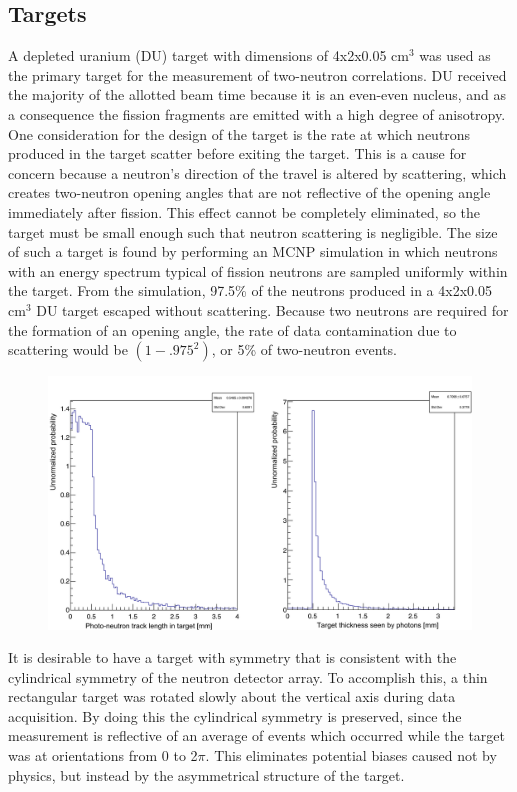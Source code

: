 \subsection{Targets}
A depleted uranium (DU) target with dimensions of 4x2x0.05 $\text{cm}^3$ was used as the primary target for the measurement of two-neutron correlations.
DU received the majority of the allotted beam time because it is an even-even nucleus, and as a consequence the fission fragments are emitted with a high degree of anisotropy.
One consideration for the design of the target is the rate at which neutrons produced in the target scatter before exiting the target.
This is a cause for concern because a neutron's direction of the travel is altered by scattering, which creates two-neutron opening angles that are not reflective of the opening angle immediately after fission.
This effect cannot be completely eliminated, so the target must be small enough such that neutron scattering is negligible.
The size of such a target is found by performing an MCNP simulation in which neutrons with an energy spectrum typical of fission neutrons are sampled uniformly within the target.
From the simulation, 97.5\% of the neutrons produced in a 4x2x0.05 $\text{cm}^3$ DU target escaped without scattering.
Because two neutrons are required for the formation of an opening angle, the rate of data contamination due to scattering would be $(1-.975^2)$, or 5\% of two-neutron events.
\begin{figure}
    \centering
    \includegraphics[width = \textwidth]{Content/Methods/ScatteringInTarget.png}
    \caption{}
    \label{fig:ScatteringInTarget}
\end{figure}

It is desirable to have a target with symmetry that is consistent with the cylindrical symmetry of the neutron detector array.
To accomplish this, a thin rectangular target was rotated slowly about the vertical axis during data acquisition.
By doing this the cylindrical symmetry is preserved, since the measurement is reflective of an average of events which occurred while the target was at orientations from 0 to 2$\pi$.
This eliminates potential biases caused not by physics, but instead by the asymmetrical structure of the target.

